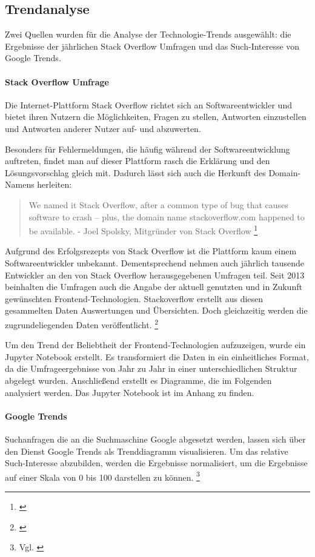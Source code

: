 

\subsection{Trendanalyse}

Zwei Quellen wurden für die Analyse der Technologie-Trends ausgewählt: die Ergebnisse der jährlichen Stack Overflow Umfragen und das Such-Interesse von Google Trends.


\paragraph{Stack Overflow Umfrage}
Die Internet-Plattform Stack Overflow richtet sich an Softwareentwickler und bietet ihren Nutzern die Möglichkeiten, Fragen zu stellen, Antworten einzustellen und Antworten anderer Nutzer auf- und abzuwerten.

Besonders für Fehlermeldungen, die häufig während der Softwareentwicklung auftreten, findet man auf dieser Plattform rasch die Erklärung und den Lösungsvorschlag gleich mit.
Dadurch lässt sich auch die Herkunft des Domain-Namens herleiten:

\begin{quotation}
We named it Stack Overflow, after a common type of bug that causes software to crash -- plus, the domain name stackoverflow.com happened to be available. - Joel Spolsky, Mitgründer von Stack Overflow \footnote{\cite{TheUnprovenPath}}
\end{quotation}

Aufgrund des Erfolgsrezepts von Stack Overflow ist die Plattform kaum einem Softwareentwickler unbekannt.
Dementsprechend nehmen auch jährlich tausende Entwickler an den von Stack Overflow herausgegebenen Umfragen teil.
Seit  2013 beinhalten die Umfragen auch die Angabe der aktuell genutzten und in Zukunft gewünschten Frontend-Technologien.
Stackoverflow erstellt aus diesen gesammelten Daten Auswertungen und Übersichten.
Doch gleichzeitig werden die zugrundeliegenden Daten veröffentlicht.
\footnote{\cite{StackOverflowInsights}} 

Um den Trend der Beliebtheit der Frontend-Technologien aufzuzeigen, wurde ein Jupyter Notebook erstellt.
Es transformiert die Daten in ein einheitliches Format, da die  Umfrageergebnisse von Jahr zu Jahr in einer unterschiedlichen Struktur abgelegt wurden.
Anschließend erstellt es Diagramme, die im Folgenden analysiert werden.
Das Jupyter Notebook ist im  Anhang zu finden.

\paragraph{Google Trends} Suchanfragen die an die Suchmaschine Google  abgesetzt werden, lassen sich  über den Dienst Google Trends  als Trenddiagramm visualisieren.
Um das relative Such-Interesse abzubilden, werden die Ergebnisse normalisiert, um die Ergebnisse auf einer Skala von 0 bis 100 darstellen zu können.
\footnote{Vgl. \cite{GoogleTrendsHilfe}}


